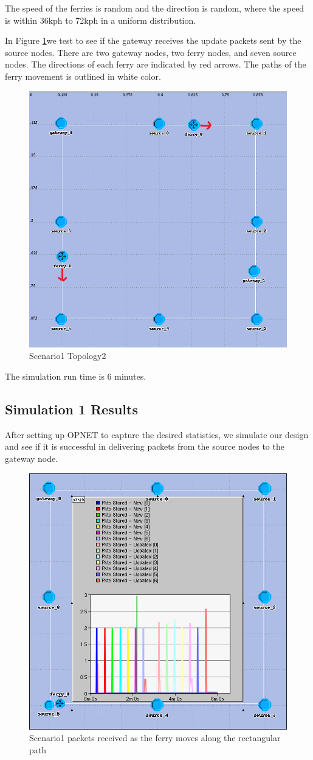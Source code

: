 The speed of the ferries is random and the direction is random, where the speed is within 36kph to 72kph in a uniform distribution.  

In Figure \ref{fig:scenario1}we test to see if the gateway receives the update packets sent by the source nodes.  
There are two gateway nodes, two ferry nodes, and seven source nodes.  
The directions of each ferry are indicated by red arrows.
The paths of the ferry movement is outlined in white color.

\begin{figure}[h]
    \centering
    \includegraphics[width=.7\textwidth]{images/scenario1-top2}
    \caption{Scenario1 Topology2}
    \label{fig:scenario1}
\end{figure}

The simulation run time is 6 minutes.  

\subsection{Simulation 1 Results}

After setting up OPNET to capture the desired statistics, we simulate our design and see if it is successful in delivering packets from the source nodes to the gateway node.

\begin{figure}[h]
    \centering
    \includegraphics[width=.5\textwidth]{images/scenario1-result-received}
    \caption{Scenario1 packets received as the ferry moves along the rectangular path}
    \label{fig:result1-a}
\end{figure}

